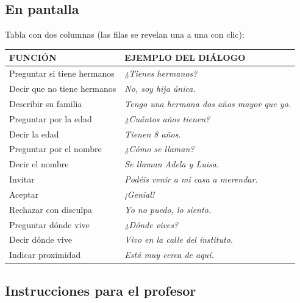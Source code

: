 \documentclass[a4paper,11pt]{article}
\begin{document}
\vspace{0.5cm}

\subsection*{En pantalla}

Tabla con dos columnas (las filas se revelan una a una con clic):

\vspace{0.3cm}

\begin{center}
\renewcommand{\arraystretch}{1.4}
\begin{tabular}{|>{\raggedright\arraybackslash}p{4.5cm}|>{\raggedright\arraybackslash}p{8.5cm}|}
\hline
\rowcolor{violeta!15}
\textbf{FUNCIÓN} & \textbf{EJEMPLO DEL DIÁLOGO} \\
\hline
Preguntar si tiene hermanos & \textit{¿Tienes hermanos?} \\
\hline
Decir que no tiene hermanos & \textit{No, soy hija única.} \\
\hline
Describir su familia & \textit{Tengo una hermana dos años mayor que yo.} \\
\hline
Preguntar por la edad & \textit{¿Cuántos años tienen?} \\
\hline
Decir la edad & \textit{Tienen 8 años.} \\
\hline
Preguntar por el nombre & \textit{¿Cómo se llaman?} \\
\hline
Decir el nombre & \textit{Se llaman Adela y Luisa.} \\
\hline
Invitar & \textit{Podéis venir a mi casa a merendar.} \\
\hline
Aceptar & \textit{¡Genial!} \\
\hline
Rechazar con disculpa & \textit{Yo no puedo, lo siento.} \\
\hline
Preguntar dónde vive & \textit{¿Dónde vives?} \\
\hline
Decir dónde vive & \textit{Vivo en la calle del instituto.} \\
\hline
Indicar proximidad & \textit{Está muy cerca de aquí.} \\
\hline
\end{tabular}
\end{center}

\vspace{0.5cm}

\subsection*{Instrucciones para el profesor}
\end{document}
